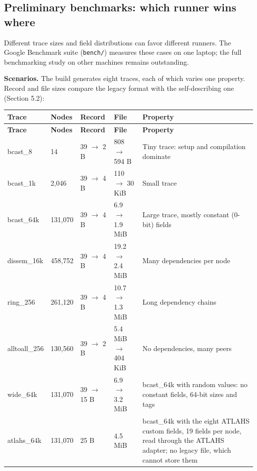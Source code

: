 \documentclass[10pt,a4paper]{article}
\begin{document}
\hypertarget{preliminary-benchmarks}{}
\subsection{Preliminary benchmarks: which runner wins where}

Different trace sizes and field distributions can favor different runners. The Google Benchmark suite (\texttt{bench/}) measures these cases on one laptop; the full benchmarking study on other machines remains outstanding.

\textbf{Scenarios.} The build generates eight traces, each of which varies one property. Record and file sizes compare the legacy format with the self-describing one (Section 5.2):

{\small
\begin{longtable}{P{0.15\dimexpr{}\tabcolsep\relax}P{0.1\dimexpr{}\tabcolsep\relax}P{0.12\dimexpr{}\tabcolsep\relax}P{0.21\dimexpr{}\tabcolsep\relax}P{0.42\dimexpr{}\tabcolsep\relax}}
\toprule
\textbf{Trace} & \textbf{Nodes} & \textbf{Record} & \textbf{File} & \textbf{Property} \\
\midrule
\endfirsthead
\toprule
\textbf{Trace} & \textbf{Nodes} & \textbf{Record} & \textbf{File} & \textbf{Property} \\
\midrule
\endhead
\bottomrule
\endfoot
bcast\_8 & 14 & 39 \(\rightarrow\) 2 B & 808 \(\rightarrow\) 594 B & Tiny trace: setup and compilation dominate \\
bcast\_1k & 2,046 & 39 \(\rightarrow\) 4 B & 110 \(\rightarrow\) 30 KiB & Small trace \\
bcast\_64k & 131,070 & 39 \(\rightarrow\) 4 B & 6.9 \(\rightarrow\) 1.9 MiB & Large trace, mostly constant (0-bit) fields \\
dissem\_16k & 458,752 & 39 \(\rightarrow\) 4 B & 19.2 \(\rightarrow\) 2.4 MiB & Many dependencies per node \\
ring\_256 & 261,120 & 39 \(\rightarrow\) 4 B & 10.7 \(\rightarrow\) 1.3 MiB & Long dependency chains \\
alltoall\_256 & 130,560 & 39 \(\rightarrow\) 2 B & 5.4 MiB \(\rightarrow\) 404 KiB & No dependencies, many peers \\
wide\_64k & 131,070 & 39 \(\rightarrow\) 15 B & 6.9 \(\rightarrow\) 3.2 MiB & bcast\_64k with random values: no constant fields, 64-bit sizes and tags \\
atlahs\_64k & 131,070 & 25 B & 4.5 MiB & bcast\_64k with the eight ATLAHS custom fields, 19 fields per node, read through the ATLAHS adapter; no legacy file, which cannot store them \\
\end{longtable}
}
\end{document}
